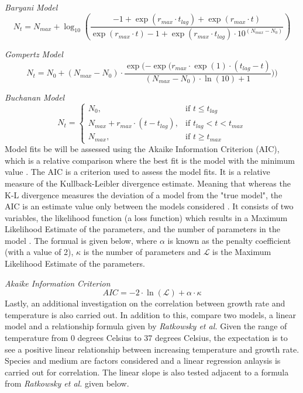 \documentclass[11pt]{article}
\begin{document}
\textit{Baryani Model}
\begin{equation*}
    N_t = N_{max} + \log_{10}(\frac{-1 + \exp(r_{max} \cdot t_{lag}) + \exp(r_{max} \cdot t)}{\exp(r_{max} \cdot t) - 1 + \exp(r_{max} \cdot t_{lag}) \cdot 10^(N_{max} - N_0)}) \label{eq:Baranyi Model} \tag{1.2}
\end{equation*}

\textit{Gompertz Model}
\begin{equation*}
    N_t =  N_0 + (N_{max} - N_0) \cdot \frac{\exp(-\exp(r_{max} \cdot \exp(1) \cdot (t_{lag} - t)}{(N_{max} - N_0) \cdot \ln(10) + 1})) \label{eq:Gompertz Model} \tag{1.3}
\end{equation*}

\textit{Buchanan Model}
\begin{equation*}
    N_t = \begin{cases}
          N_0, & \text{if } t\leq t_{lag}\\
          N_{max} + r_{max} \cdot (t - t_{lag}), & \text{if } t_{lag} < t < t_{max}\\
          N_{max}, & \text{if } t\geq t_{max}
          \end{cases} \label{eq:Buchanan Model} \tag{1.4}
\end{equation*}
Model fits be will be assessed using the Akaike Information Criterion (AIC), which is a relative comparison where the best fit is the model with the minimum value \cite{vrieze2012model, posada2004model}. The AIC is a criterion used to assess the model fits. It is a relative measure of the Kullback-Leibler divergence estimate. Meaning that whereas the K-L divergence measures the deviation of a model from the "true model", the AIC is an estimate value only between the models considered \cite{vrieze2012model}. It consists of two variables, the likelihood function (a loss function) which results in a Maximum Likelihood Estimate of the parameters, and the number of parameters in the model \cite{vrieze2012model}. The formual is given below, where $\alpha$ is known as the penalty coefficient (with a value of 2), $\kappa$ is the number of parameters and $\mathcal{L}$ is the Maximum Likelihood Estimate of the parameters.

\textit{Akaike Information Criterion}
\begin{equation*}
    AIC = -2 \cdot \ln{(\mathcal{L})} + \alpha \cdot \kappa \label{eq:AIC} \tag{2}
\end{equation*}
Lastly, an additional investigation on the correlation between growth rate and temperature is also carried out. In addition to this, compare two models, a linear model and a relationship formula given by \textit{Ratkowsky et al.} Given the range of temperature from 0 degrees Celsius to 37 degrees Celsius, the expectation is to see a positive linear relationship between increasing temperature and growth rate. Species and medium are factors considered and a linear regression anlaysis is carried out for correlation. The linear slope is also tested adjacent to a formula from \textit{Ratkowsky et al.} given below.
\end{document}
